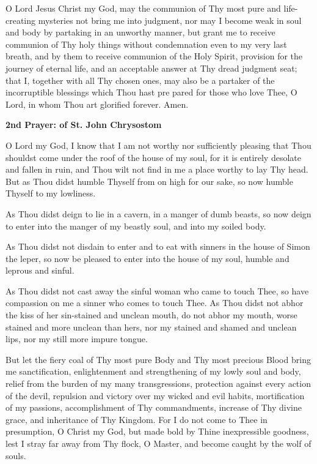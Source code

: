 O Lord Jesus Christ my God, may the communion of Thy most pure and life-creating mysteries not bring me into judgment, nor may I become weak in soul and body by partaking in an unworthy manner, but grant me to receive communion of Thy holy things without condemnation even to my very last breath, and by them to receive communion of the Holy Spirit, provision for the journey of eternal life, and an acceptable answer at Thy dread judgment seat; that I, together with all Thy chosen ones, may also be a partaker of the incorruptible blessings which Thou hast pre pared for those who love Thee, O Lord, in whom Thou art glorified forever. Amen.

\begin{center}
\textbf{2nd Prayer: of St. John Chrysostom}
\end{center}

O Lord my God, I know that I am not worthy nor sufficiently pleasing that Thou shouldst come under the roof of the house of my soul, for it is entirely desolate and fallen in ruin, and Thou wilt not find in me a place worthy to lay Thy head. But as Thou didst humble Thyself from on high for our sake, so now humble Thyself to my lowliness. 

As Thou didst deign to lie in a cavern, in a manger of dumb beasts, so now deign to enter into the manger of my beastly soul, and into my soiled body.

As Thou didst not disdain to enter and to eat with sinners in the house of Simon the leper, so now be pleased to enter into the house of my soul, humble and leprous and sinful.

As Thou didst not cast away the sinful woman who came to touch Thee, so have compassion on me a sinner who comes to touch Thee. As Thou didst not abhor the kiss of her sin-stained and unclean mouth, do not abhor my mouth, worse stained and more unclean than hers, nor my stained and shamed and unclean lips, nor my still more impure tongue.

But let the fiery coal of Thy most pure Body and Thy most precious Blood bring me sanctification, enlightenment and strengthening of my lowly soul and body, relief from the burden of my many transgressions, protection against every action of the devil, repulsion and victory over my wicked and evil habits, mortification of my passions, accomplishment of Thy commandments, increase of Thy divine grace, and inheritance of Thy Kingdom. For I do not come to Thee in presumption, O Christ my God, but made bold by Thine inexpressible goodness, lest I stray far away from Thy flock, O Master, and become caught by the wolf of souls.

